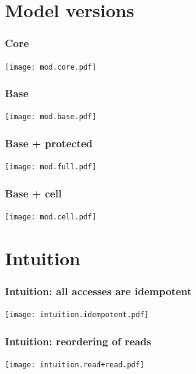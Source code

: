 \appendix

\section{Model versions}

\begin{frame}
    \frametitle{Core}
    \texttt{[image: mod.core.pdf]}
\end{frame}

\begin{frame}
    \frametitle{Base}
    \texttt{[image: mod.base.pdf]}
\end{frame}

\begin{frame}
    \frametitle{Base + protected}
    \texttt{[image: mod.full.pdf]}
\end{frame}

\begin{frame}
    \frametitle{Base + cell}
    \texttt{[image: mod.cell.pdf]}
\end{frame}

\section{Intuition}

\begin{frame}
    \frametitle{Intuition: all accesses are idempotent}
    \texttt{[image: intuition.idempotent.pdf]}
\end{frame}

\begin{frame}
    \frametitle{Intuition: reordering of reads}
    \texttt{[image: intuition.read+read.pdf]}
\end{frame}
